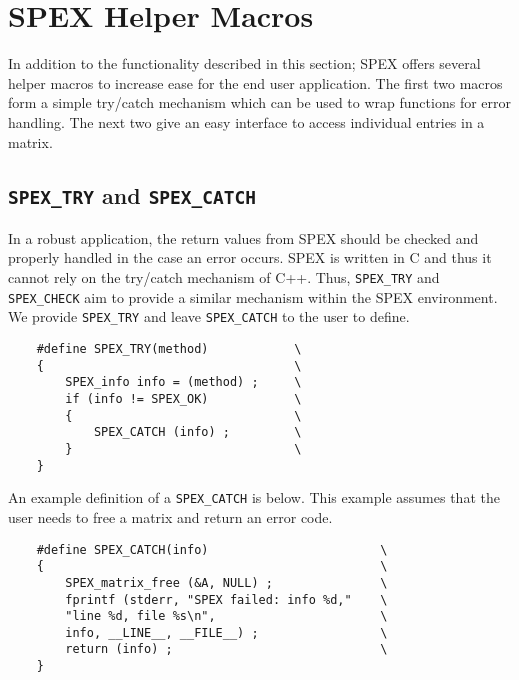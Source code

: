 \documentclass[12pt,oneside]{book}
\theoremstyle{definition}
\begin{document}
\section{SPEX Helper Macros} \label{ss:SPEX_helper_macros}

In addition to the functionality described in this section; SPEX offers several helper macros to increase ease for the end user application. The first two macros form a simple try/catch mechanism which can be used to wrap functions for error handling. The next two give an easy interface to access individual entries in a matrix.

\subsection{\texttt{SPEX\_TRY} and 
\texttt{SPEX\_CATCH}}

In a robust application, the return values from SPEX should be checked and properly handled in the case an error occurs. SPEX is written in C and thus it cannot rely on the try/catch mechanism of C++. Thus, \verb|SPEX_TRY| and \verb|SPEX_CHECK| aim to provide a similar mechanism within the SPEX environment. We provide \verb|SPEX_TRY| and leave \verb|SPEX_CATCH| to the user to define.

\newpage
\begin{mdframed}[userdefinedwidth=\textwidth]
{\footnotesize
\begin{verbatim}
    #define SPEX_TRY(method)            \
    {                                   \
        SPEX_info info = (method) ;     \
        if (info != SPEX_OK)            \
        {                               \
            SPEX_CATCH (info) ;         \
        }                               \
    }
\end{verbatim}
} \end{mdframed}

An example definition of a \verb|SPEX_CATCH| is below. This example assumes that the user needs to free a matrix and return an error code.
\begin{mdframed}[userdefinedwidth=\textwidth]
{\footnotesize
\begin{verbatim}
    #define SPEX_CATCH(info)                        \
    {                                               \
        SPEX_matrix_free (&A, NULL) ;               \
        fprintf (stderr, "SPEX failed: info %d,"    \
        "line %d, file %s\n",                       \
        info, __LINE__, __FILE__) ;                 \
        return (info) ;                             \
    } 
\end{verbatim}
} \end{mdframed}
\end{document}
